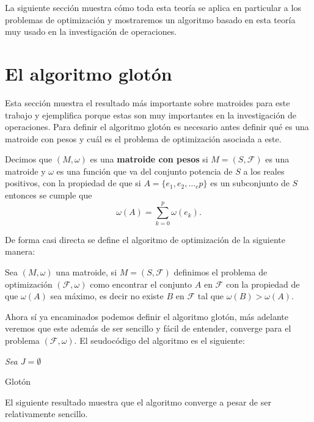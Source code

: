 La siguiente sección muestra cómo toda esta teoría se aplica en particular a los problemas de optimización y mostraremos un algoritmo basado en esta teoría muy usado en la investigación de operaciones. 

\section{El algoritmo glotón}

Esta sección muestra el resultado más importante sobre matroides para este trabajo y ejemplifica porque estas son muy importantes en la investigación de operaciones. Para definir el algoritmo glotón es necesario antes definir qué es una matroide con pesos y cuál es el problema de optimización asociada a este. 

\begin{dfn}
Decimos que $(M,\omega)$ es una \textbf{matroide con pesos} si $M=(S,\mathcal{F})$ es una matroide y $\omega$ es una función que va del conjunto potencia de $S$ a los reales positivos, con la propiedad de que si $A=\{e_1,e_2,\dots_ep\}$ es un subconjunto de $S$ entonces se cumple que $$\omega(A) = \sum_{k=0}^p \omega(e_k).$$
\end{dfn}

De forma casi directa se define el algoritmo de optimización de la siguiente manera:

\begin{dfn}
Sea $(M,\omega)$ una matroide, si $M=(S,\mathcal{F})$ definimos el problema de optimización $(\mathcal{F},\omega)$ como encontrar el conjunto $A$ en $\mathcal{F}$ con la propiedad de que $\omega(A)$ sea máximo, es decir no existe $B$ en $\mathcal{F}$ tal que $\omega(B) > \omega(A)$.
\end{dfn}

Ahora sí ya encaminados podemos definir el algoritmo glotón, más adelante veremos que este además de ser sencillo y fácil de entender, converge para el problema $(\mathcal{F},\omega)$. El seudocódigo del algoritmo es el siguiente:

\IncMargin{1em}
\begin{Algoritmo}[H]
\BlankLine
\emph{Sea $J=\emptyset$ \; }
\caption{Glotón}
\end{Algoritmo}
\DecMargin{1em}
El siguiente resultado muestra que el algoritmo converge a pesar de ser relativamente sencillo.

